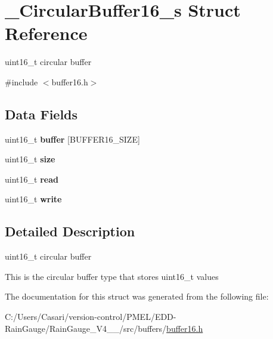 \hypertarget{struct___circular_buffer16__s}{}\section{\+\_\+\+Circular\+Buffer16\+\_\+s Struct Reference}
\label{struct___circular_buffer16__s}


uint16\+\_\+t circular buffer  




{\ttfamily \#include $<$buffer16.\+h$>$}

\subsection*{Data Fields}
\begin{DoxyCompactItemize}
\item 
\hypertarget{struct___circular_buffer16__s_adc5269ddc20bc86716b8f66adb410a7f}{}uint16\+\_\+t {\bfseries buffer} \mbox{[}B\+U\+F\+F\+E\+R16\+\_\+\+S\+I\+Z\+E\mbox{]}\label{struct___circular_buffer16__s_adc5269ddc20bc86716b8f66adb410a7f}

\item 
\hypertarget{struct___circular_buffer16__s_aaba88b24a21a6c70c895c0d55f4a69a0}{}uint16\+\_\+t {\bfseries size}\label{struct___circular_buffer16__s_aaba88b24a21a6c70c895c0d55f4a69a0}

\item 
\hypertarget{struct___circular_buffer16__s_a17fc9132ed0f45e5ef7a59e6a93abeb0}{}uint16\+\_\+t {\bfseries read}\label{struct___circular_buffer16__s_a17fc9132ed0f45e5ef7a59e6a93abeb0}

\item 
\hypertarget{struct___circular_buffer16__s_abac7c895b71c1b4d5b21beabca7ea63c}{}uint16\+\_\+t {\bfseries write}\label{struct___circular_buffer16__s_abac7c895b71c1b4d5b21beabca7ea63c}

\end{DoxyCompactItemize}


\subsection{Detailed Description}
uint16\+\_\+t circular buffer 

This is the circular buffer type that stores uint16\+\_\+t values 

The documentation for this struct was generated from the following file\+:\begin{DoxyCompactItemize}
\item 
C\+:/\+Users/\+Casari/version-\/control/\+P\+M\+E\+L/\+E\+D\+D-\/\+Rain\+Gauge/\+Rain\+Gauge\+\_\+\+V4\+\_\+\_/src/buffers/\hyperlink{buffer16_8h}{buffer16.\+h}\end{DoxyCompactItemize}
